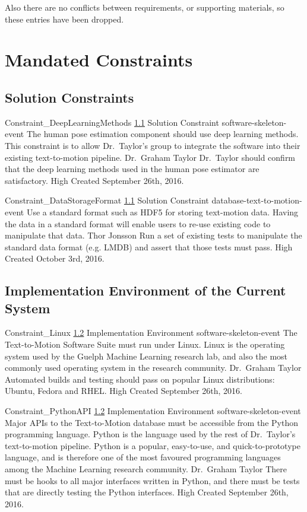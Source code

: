 \documentclass{scrreprt}
\begin{document}
Also there are no conflicts between requirements, or supporting materials, so
these entries have been dropped.

\section{Mandated Constraints}

\subsection{Solution Constraints}
\label{req-solution-constraint}

\requirement
{Constraint_DeepLearningMethods}
{\ref{req-solution-constraint} Solution Constraint}
{software-skeleton-event}
{The human pose estimation component should use deep learning methods.}
{This constraint is to allow Dr.\ Taylor's group to integrate the software into
 their existing text-to-motion pipeline.}
{Dr.\ Graham Taylor}
{Dr.\ Taylor should confirm that the deep learning methods used in the human
 pose estimator are satisfactory.}
{High}
{Created September 26th, 2016.}

\requirement
{Constraint_DataStorageFormat}
{\ref{req-solution-constraint} Solution Constraint}
{database-text-to-motion-event}
{Use a standard format such as HDF5 for storing text-motion data.}
{Having the data in a standard format will enable users to re-use existing code
 to manipulate that data.}
{Thor Jonsson }
{Run a set of existing tests to manipulate the standard data format (e.g. LMDB)
 and assert that those tests must pass.}
{High}
{Created October 3rd, 2016.}

\subsection{Implementation Environment of the Current System}
\label{req-implementation-environment}

\requirement
{Constraint_Linux}
{\ref{req-implementation-environment} Implementation Environment}
{software-skeleton-event}
{The Text-to-Motion Software Suite must run under Linux.}
{Linux is the operating system used by the Guelph Machine Learning research
 lab, and also the most commonly used operating system in the research
 community.}
{Dr.\ Graham Taylor}
{Automated builds and testing should pass on popular Linux distributions:
 Ubuntu, Fedora and RHEL.}
{High}
{Created September 26th, 2016.}

\requirement
{Constraint_PythonAPI}
{\ref{req-implementation-environment} Implementation Environment}
{software-skeleton-event}
{Major APIs to the Text-to-Motion database must be accessible from the Python
 programming language.}
{Python is the language used by the rest of Dr.\ Taylor's text-to-motion
 pipeline. Python is a popular, easy-to-use, and quick-to-prototype language,
 and is therefore one of the most favoured programming languages among the
 Machine Learning research community.}
{Dr.\ Graham Taylor}
{There must be hooks to all major interfaces written in Python, and there must
 be tests that are directly testing the Python interfaces.}
{High}
{Created September 26th, 2016.}
\end{document}
